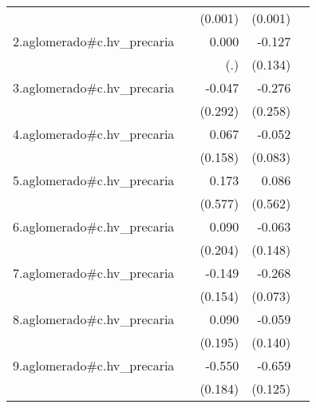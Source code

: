 {\begin{longtable}{l*{4}{D{.}{.}{-1}}}
            &                     &     (0.001)         &     (0.001)         &                     \\
\addlinespace
2.aglomerado#c.hv\_precaria&                     &       0.000         &      -0.127         &                     \\
            &                     &         (.)         &     (0.134)         &                     \\
\addlinespace
3.aglomerado#c.hv\_precaria&                     &      -0.047         &      -0.276         &                     \\
            &                     &     (0.292)         &     (0.258)         &                     \\
\addlinespace
4.aglomerado#c.hv\_precaria&                     &       0.067         &      -0.052         &                     \\
            &                     &     (0.158)         &     (0.083)         &                     \\
\addlinespace
5.aglomerado#c.hv\_precaria&                     &       0.173         &       0.086         &                     \\
            &                     &     (0.577)         &     (0.562)         &                     \\
\addlinespace
6.aglomerado#c.hv\_precaria&                     &       0.090         &      -0.063         &                     \\
            &                     &     (0.204)         &     (0.148)         &                     \\
\addlinespace
7.aglomerado#c.hv\_precaria&                     &      -0.149         &      -0.268\sym{***}&                     \\
            &                     &     (0.154)         &     (0.073)         &                     \\
\addlinespace
8.aglomerado#c.hv\_precaria&                     &       0.090         &      -0.059         &                     \\
            &                     &     (0.195)         &     (0.140)         &                     \\
\addlinespace
9.aglomerado#c.hv\_precaria&                     &      -0.550\sym{**} &      -0.659\sym{***}&                     \\
            &                     &     (0.184)         &     (0.125)         &                     \\

\end{longtable}}
